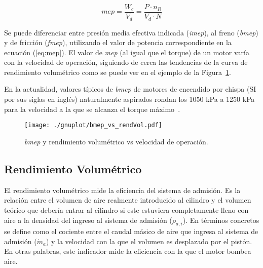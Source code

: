 \begin{equation}\label{eq:mep}
  mep = \frac{W_{c}}{V_d} = \frac{P \cdot n_R}{V_d \cdot N}
\end{equation}
%

Se puede diferenciar entre presión media efectiva indicada (\emph{imep}), al
freno (\emph{bmep}) y de fricción (\emph{fmep}), utilizando el valor de potencia
correspondiente en la ecuación (\ref{eq:mep}).
%
El valor de \emph{mep} (al igual que el torque) de un motor varía con la
velocidad de operación, siguiendo de cerca las tendencias de la curva de
rendimiento volumétrico como se puede ver en el ejemplo de la
Figura~\ref{fig:bmep_tipica}.

En la actualidad, valores típicos de \emph{bmep} de motores de encendido por
chispa (SI por sus siglas en inglés) naturalmente aspirados rondan los 1050 kPa
a 1250 kPa para la velocidad a la que se alcanza el torque máximo~\parencite{heywood}.

\begin{figure} \centering
\texttt{[image: ./gnuplot/bmep\_vs\_rendVol.pdf]}
    \caption{\emph{bmep} y rendimiento volumétrico vs velocidad de operación.}
    \label{fig:bmep_tipica}
\end{figure}



\subsection{Rendimiento Volumétrico}
%
El rendimiento volumétrico mide la eficiencia del sistema de admisión.
%
Es la relación entre el volumen de aire realmente introducido al cilindro y el
volumen teórico que debería entrar al cilindro si este estuviera completamente
lleno con aire a la densidad del ingreso al sistema de admisión ($\rho_{a,i}$).
%
En términos concretos se define como el cociente entre el caudal másico de aire
que ingresa al sistema de admisión ($\dot{m}_{a}$) y la velocidad con la que el
volumen es desplazado por el pistón.
%
En otras palabras, este indicador mide la eficiencia con la que el motor bombea
aire.

